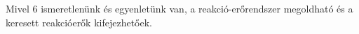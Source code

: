 Mivel 6 ismeretlenünk és egyenletünk van, a reakció-erőrendszer megoldható és a keresett reakcióerők kifejezhetőek.

\begin{center}
\end{center}

